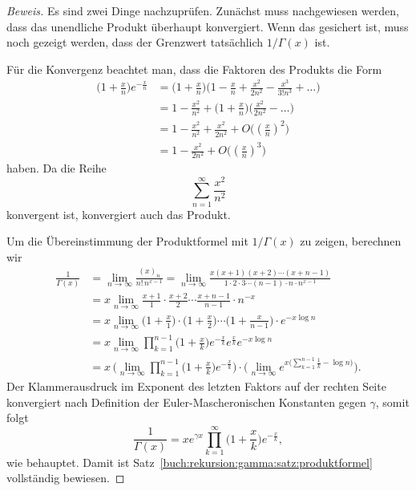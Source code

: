 \begin{proof}[Beweis]
Es sind zwei Dinge nachzuprüfen.
Zunächst muss nachgewiesen werden, dass das unendliche Produkt 
überhaupt konvergiert.
Wenn das gesichert ist, muss noch gezeigt werden, dass der Grenzwert
tatsächlich $1/\Gamma(x)$ ist.

Für die Konvergenz beachtet man, dass die Faktoren des Produkts 
die Form
\begin{align*}
\biggl(1+\frac{x}n\biggr)e^{-\frac{x}{n}}
&=
\biggl(1+\frac{x}n\biggr)
\biggl(1-\frac{x}{n}+\frac{x^2}{2n^2}-\frac{x^3}{3!n^3}+\dots\biggr)
\\
&=
1-\frac{x^2}{n^2} + 
\biggl(1+\frac{x}n\biggr)
\biggl(\frac{x^2}{2n^2}-\dots\biggr)
\\
&=
1-\frac{x^2}{n^2} + \frac{x^2}{2n^2} + O\bigl((\textstyle\frac{x}{n})^2\bigr)
\\
&=
1-\frac{x^2}{2n^2} + O\bigl((\textstyle\frac{x}{n})^3\bigr)
\end{align*}
haben.
Da die Reihe 
\[
\sum_{n=1}^\infty \frac{x^2}{n^2}
\]
konvergent ist, konvergiert auch das Produkt.

Um die Übereinstimmung der Produktformel mit $1/\Gamma(x)$ zu zeigen,
berechnen wir
\begin{align*}
\frac{1}{\Gamma(x)}
&=
\lim_{n\to\infty} 
\frac{(x)_n}{n!\,n^{x-1}}
=
\lim_{n\to\infty} 
\frac{x(x+1)(x+2)\cdots(x+n-1)}{1\cdot 2\cdot3\cdots (n-1)\cdot n\cdot n^{x-1}}
\\
&=
x
\lim_{n\to\infty} 
\frac{x+1}{1}
\cdot
\frac{x+2}{2}
\cdots
\frac{x+n-1}{n-1}
\cdot
n^{-x}
\\
&=
x
\lim_{n\to\infty}
\biggl(1+\frac{x}{1}\biggr)
\cdot
\biggl(1+\frac{x}{2}\biggr)
\cdots
\biggl(1+\frac{x}{n-1}\biggr)
\cdot
e^{-x\log n}
\\
&=
x
\lim_{n\to\infty}
\prod_{k=1}^{n-1}
\biggl(1+\frac{x}{k}\biggr)
e^{-\frac{x}{k}}
e^{\frac{x}{k}}
e^{-x\log n}
\\
&=
x\,
\biggl(
\lim_{n\to\infty}
\prod_{k=1}^{n-1}
\biggl(1+\frac{x}{k}\biggr)
e^{-\frac{x}{k}}
\biggr)
\cdot
\biggl(
\lim_{n\to\infty}
e^{x\bigl(\sum_{k=1}^{n-1}\frac{1}{k} - \log n\bigr)}
\biggr).
\end{align*}
Der Klammerausdruck im Exponent des letzten Faktors auf der rechten Seite
konvergiert nach Definition der Euler-Mascheronischen Konstanten gegen
$\gamma$, somit folgt 
\[
\frac{1}{\Gamma(x)}
=
xe^{\gamma x}\prod_{k=1}^\infty \biggl(1+\frac{x}{k}\biggr)e^{-\frac{x}{k}},
\]
wie behauptet.
Damit ist Satz~\ref{buch:rekursion:gamma:satz:produktformel}
vollständig bewiesen.
\end{proof}

